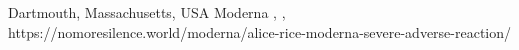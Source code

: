           {Dartmouth, Massachusetts, USA}
          {}
          {Moderna}
          {}
          {
            ,
            ,
          }
          {https://nomoresilence.world/moderna/alice-rice-moderna-severe-adverse-reaction/}

